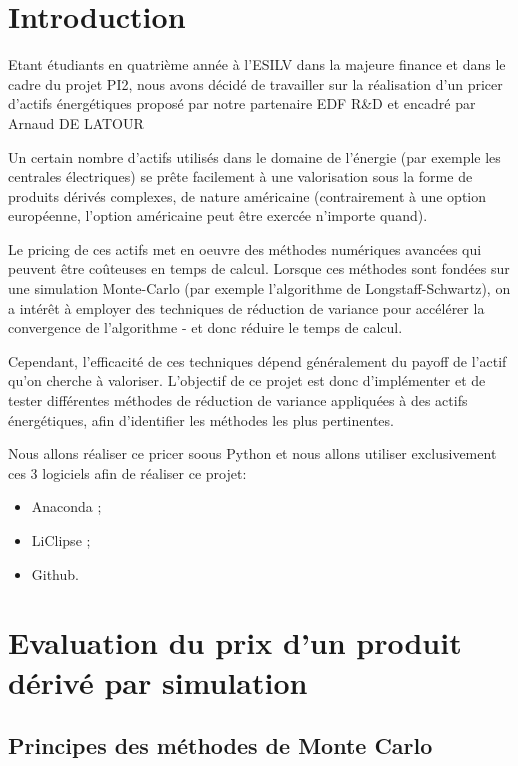 \documentclass[12pt]{report}
\begin{document}
\chapter*{Introduction}

Etant étudiants en quatrième année à l’ESILV dans la majeure finance et
dans le cadre du projet PI2, nous avons décidé de travailler sur la
réalisation d’un pricer d’actifs énergétiques proposé par notre partenaire EDF R\&D et encadré par Arnaud DE LATOUR

Un certain nombre d'actifs utilisés dans le domaine de l'énergie (par exemple les
centrales électriques) se prête facilement à une valorisation sous la forme de
produits dérivés complexes, de nature américaine (contrairement à une option
européenne, l'option américaine peut être exercée n'importe quand).

Le pricing de ces actifs met en oeuvre des méthodes numériques avancées qui
peuvent être coûteuses en temps de calcul. Lorsque ces méthodes sont fondées sur
une simulation Monte-Carlo (par exemple l'algorithme de Longstaff-Schwartz), on a
intérêt à employer des techniques de réduction de variance pour accélérer la
convergence de l'algorithme - et donc réduire le temps de calcul.

Cependant, l'efficacité de ces techniques dépend généralement du payoff de l'actif
qu'on cherche à valoriser. L'objectif de ce projet est donc d'implémenter et de
tester différentes méthodes de réduction de variance appliquées à des actifs
énergétiques, afin d'identifier les méthodes les plus pertinentes.

Nous allons réaliser ce pricer soous Python et nous allons utiliser exclusivement
ces 3 logiciels afin de réaliser ce projet:
\begin{itemize}
	\item Anaconda ;
	\item LiClipse ;
	\item Github.
\end{itemize}

\chapter{Evaluation du prix d'un produit dérivé par simulation}

\section{Principes des méthodes de Monte Carlo}
\end{document}

